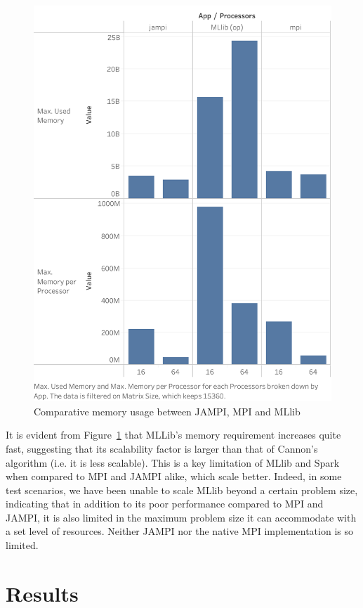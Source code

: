 \documentclass[fleqn,10pt]{SelfArx} %
\begin{document}
\begin{figure}
	\centering
	\includegraphics[width=0.9\linewidth]{figures/memory.png}
	\vspace{14pt}
	\caption{Comparative memory usage between JAMPI, MPI and MLlib}
	\label{fig:memory_usage}
\end{figure}

It is evident from Figure~\ref{fig:memory_usage} that MLLib's memory requirement increases quite fast, suggesting that its scalability factor is larger than that of Cannon's algorithm (i.e. it is less scalable). This is a key limitation of MLlib and Spark when compared to MPI and JAMPI alike, which scale better. Indeed, in some test scenarios, we have been unable to scale MLlib beyond a certain problem size, indicating that in addition to its poor performance compared to MPI and JAMPI, it is also limited in the maximum problem size it can accommodate with a set level of resources. Neither JAMPI nor the native MPI implementation is so limited.


\section{Results} %
\label{sec:results}
\end{document}
